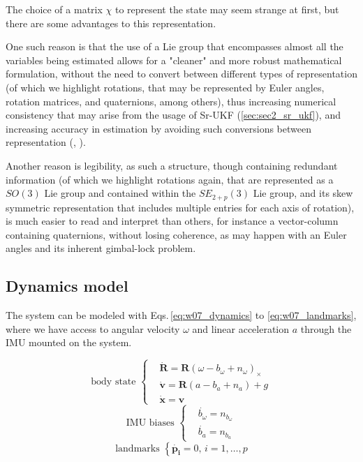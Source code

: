 \documentclass[10pt,twocolumn]{IEEEtran}
\begin{document}
The choice of a matrix $\chi$ to represent the state may seem strange at first, but there are some advantages to this representation. 

One such reason is that the use of a Lie group that encompasses almost all the variables being estimated allows for a "cleaner" and more robust mathematical formulation, without the need to convert between different types of representation (of which we highlight rotations, that may be represented by Euler angles, rotation matrices, and quaternions, among others), thus increasing numerical consistency that may arise from the usage of Sr-UKF (\ref{sec:sec2_sr_ukf}), and increasing accuracy in estimation by avoiding such conversions between representation (\cite{asl2019adaptive}, \cite{brossard2017unscented}).

Another reason is legibility, as such a structure, though containing redundant information (of which we highlight rotations again, that are represented as a $SO(3)$ Lie group and contained within the $SE_{2+p}(3)$ Lie group, and its skew symmetric representation that includes multiple entries for each axis of rotation), is much easier to read and interpret than others, for instance a vector-column containing quaternions, without losing coherence, as may happen with an Euler angles and its inherent gimbal-lock problem.         


\subsection{Dynamics model}

The system can be modeled with Eqs.\,\eqref{eq:w07_dynamics} to \eqref{eq:w07_landmarks}, where we have access to angular velocity $\omega$ and linear acceleration $a$ through the IMU mounted on the system.


\begin{equation}
    \label{eq:w07_dynamics}
    \text{body state } \left\{ 
        \begin{split}
            &\dot{\mathbf{R}} = \mathbf{R} \left(\omega - b_\omega + n_\omega \right)_\times\\ 
            &\dot{\mathbf{v}} = \mathbf{R} \left(a - b_a + n_a \right) + g \\
            &\dot{\mathbf{x}} = \mathbf{v}
        \end{split} 
     \right.
\end{equation}
\begin{equation}
    \label{eq:w07_imu}
    \text{IMU biases } \left\{ 
        \begin{split}
            &\dot{b_\omega} = n_{b_\omega}\\ 
            &\dot{b_a} = n_{b_a}
        \end{split} 
     \right.
\end{equation}
\begin{equation}
    \label{eq:w07_landmarks}
    \text{landmarks } \left\{ 
        \dot{\mathbf{p_i}} = 0,\,i=1,\ldots,p
    \right.
\end{equation}
\end{document}
